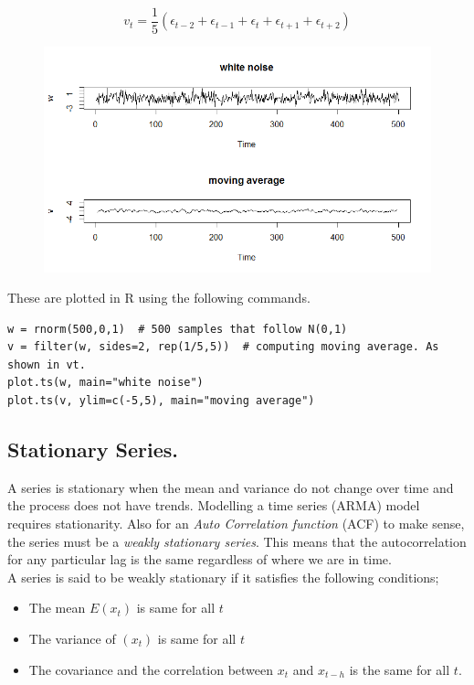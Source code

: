 \documentclass[a4paper]{article}
\theoremstyle{definition}
\begin{document}
\begin{equation*}
v_t = \frac{1}{5} (\epsilon_{t-2}+\epsilon_{t-1}+ \epsilon_t + \epsilon_{t+1}+ \epsilon_{t+2})
\end{equation*}

\begin{figure}
	[h]
	\includegraphics[width=0.9\linewidth]{../Beamer/whitenoise_ma_5}
	\caption{}
	\label{}
\end{figure}

These are plotted in R using the following commands. 

\begin{lstlisting}
w = rnorm(500,0,1)  # 500 samples that follow N(0,1)
v = filter(w, sides=2, rep(1/5,5))  # computing moving average. As shown in vt.
plot.ts(w, main="white noise")
plot.ts(v, ylim=c(-5,5), main="moving average")
\end{lstlisting}

\subsection{Stationary Series.}
A series is stationary when the mean and variance do not change over time and the process does not have trends. Modelling a time series (ARMA) model requires stationarity. Also for an \textit{Auto Correlation function} (ACF) to make sense, the series must be a \textit{weakly stationary series}. This means that the autocorrelation for any particular lag is the same regardless of where we are in time. \\

A series is said to be weakly stationary if it satisfies the following conditions;\\
\begin{itemize}
\item The mean $ E(x_t) $ is same for all $ t $
\item The variance  of $ (x_t) $ is same for all $ t $	
\item The covariance and the correlation between $ x_t $ and $ x_{t-h} $ is the same for all $ t $.
\end{itemize}
\end{document}
